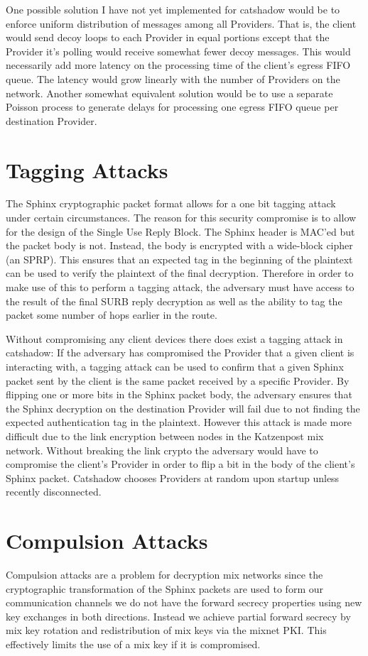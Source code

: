 \documentclass[conference]{IEEEtran}
\begin{document}
One possible solution I have not yet implemented for catshadow would
be to enforce uniform distribution of messages among all
Providers. That is, the client would send decoy loops to each Provider
in equal portions except that the Provider it's polling would receive
somewhat fewer decoy messages. This would necessarily add more
latency on the processing time of the client's egress FIFO queue. The
latency would grow linearly with the number of Providers on the
network. Another somewhat equivalent solution would be to use a
separate Poisson process to generate delays for processing one egress
FIFO queue per destination Provider.

\section{Tagging Attacks}
The Sphinx cryptographic packet format \cite{DanezisG09} allows
for a one bit tagging attack under certain circumstances. The reason
for this security compromise is to allow for the design of the Single
Use Reply Block. The Sphinx header is MAC'ed but the packet body is not.
Instead, the body is encrypted with a wide-block cipher (an SPRP). This
ensures that an expected tag in the beginning of the plaintext can be
used to verify the plaintext of the final decryption. Therefore in order
to make use of this to perform a tagging attack, the adversary must have access
to the result of the final SURB reply decryption as well as the ability to
tag the packet some number of hops earlier in the route.

Without compromising any client devices there does exist a tagging
attack in catshadow: If the adversary has compromised the Provider
that a given client is interacting with, a tagging attack can be used
to confirm that a given Sphinx packet sent by the client is the same
packet received by a specific Provider. By flipping one or more bits
in the Sphinx packet body, the adversary ensures that the Sphinx
decryption on the destination Provider will fail due to not finding
the expected authentication tag in the plaintext. However this attack
is made more difficult due to the link encryption between nodes
in the Katzenpost mix network. \cite{KatzMixWire} Without breaking the
link crypto the adversary would have to compromise the client's
Provider in order to flip a bit in the body of the client's Sphinx
packet. Catshadow chooses Providers at random upon startup unless
recently disconnected.

\section{Compulsion Attacks}
Compulsion attacks are a problem for
decryption mix networks since the cryptographic transformation of the
Sphinx packets are used to form our communication channels we do not
have the forward secrecy properties using new key exchanges in both
directions. Instead we achieve partial forward secrecy by mix key
rotation and redistribution of mix keys via the mixnet
PKI. \cite{KatzMixPKI} This effectively limits the use of a mix key if
it is compromised.
\end{document}
